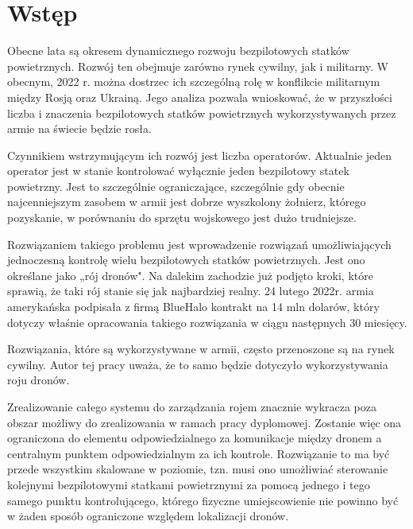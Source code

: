 

\newcommand{\kierunek}{INFORMATYKA}
\newcommand{\stopien}{STUDIA II$^{\mathrm{o}}$} %
\newcommand{\temat}{MOBILNY SYSTEM ZARZĄDZANIA I STEROWANIA BEZPILOTOWYM STATKIEM LATAJĄCYM}
\newcommand{\data}{Warszawa 2022}
\newcommand{\autor}{sierż.~pchor.~inż.~Norbert~WASZKOWIAK}
\newcommand{\promotor}{dr inż. Michał DYK}
\newcommand{\zgoda}{TAK} %
\newcommand{\specjalnosc}{SYSTEMY INFORMATYCZNE}

\newcommand{\bibTitle}[1]{``#1''}




\inserttitlepage

\section*{Wstęp} 


Obecne lata są okresem dynamicznego rozwoju bezpilotowych statków powietrznych. Rozwój ten obejmuje zarówno rynek cywilny, jak i militarny. W obecnym, 2022 r. można dostrzec ich szczególną rolę w konflikcie militarnym między Rosją oraz Ukrainą. Jego analiza pozwala wnioskować, że w przyszłości liczba i znaczenia bezpilotowych statków powietrznych wykorzystywanych przez armie na świecie będzie rosła.

Czynnikiem wstrzymującym ich rozwój jest liczba operatorów. Aktualnie jeden operator jest w stanie kontrolować wyłącznie jeden bezpilotowy statek powietrzny. Jest to szczególnie ograniczające, szczególnie gdy obecnie najcenniejszym zasobem w armii jest dobrze wyszkolony żołnierz, którego pozyskanie, w porównaniu do sprzętu wojskowego jest dużo trudniejsze.

Rozwiązaniem takiego problemu jest wprowadzenie rozwiązań umożliwiających jednoczesną kontrolę wielu bezpilotowych statków powietrznych. Jest ono określane jako „rój dronów". Na dalekim zachodzie już podjęto kroki, które sprawią, że taki rój stanie się jak najbardziej realny. 24 lutego 2022r. armia amerykańska podpisała z firmą BlueHalo kontrakt na 14 mln dolarów, który dotyczy właśnie opracowania takiego rozwiązania w ciągu następnych 30 miesięcy. \cite{usa-roj}

Rozwiązania, które są wykorzystywane w armii, często przenoszone są na rynek cywilny. Autor tej pracy uważa, że to samo będzie dotyczyło wykorzystywania roju dronów.

Zrealizowanie całego systemu do zarządzania rojem znacznie wykracza poza obszar możliwy do zrealizowania w ramach pracy dyplomowej. Zostanie więc ona ograniczona do elementu odpowiedzialnego za komunikacje między dronem a centralnym punktem odpowiedzialnym za ich kontrole. Rozwiązanie to ma być przede wszystkim skalowane w poziomie, tzn. musi ono umożliwiać sterowanie kolejnymi bezpilotowymi statkami powietrznymi za pomocą jednego i tego samego punktu kontrolującego, którego fizyczne umiejscowienie nie powinno być w żaden sposób ograniczone względem lokalizacji dronów.

